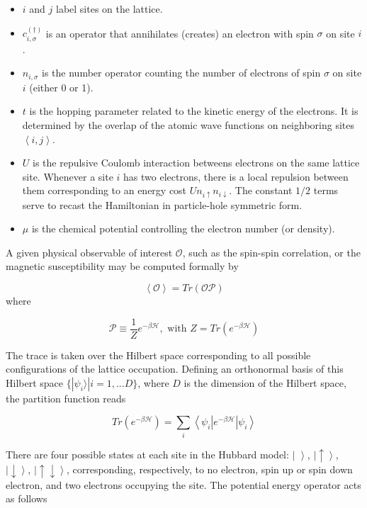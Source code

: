 \documentclass[10pt, twocolumn, twoside]{article}
\begin{document}
\begin{itemize}
\item $i$ and $j$ label sites on the lattice.
\item $c_{i,\sigma}^{(\dagger)}$ is an operator that annihilates (creates) an electron with spin $\sigma$ on site $i$.
\item $n_{i,\sigma}$ is the number operator counting the number of electrons of spin $\sigma$ on site $i$ (either 0 or 1).
\item $t$ is the hopping parameter related to the kinetic energy of the electrons. It is determined by the overlap of the atomic wave functions on neighboring sites $\left\langle i, j \right\rangle$.
\item $U$ is the repulsive Coulomb interaction betweens electrons on the same lattice site. Whenever a site $i$ has two electrons, there is a local repulsion between them corresponding to an energy cost $U n_{i \uparrow} n_{i \downarrow}$. The constant $1/2$ terms serve to recast the Hamiltonian in particle-hole symmetric form.
\item $\mu$ is the chemical potential controlling the electron number (or density).
\end{itemize}

A given physical observable of interest $\mathcal{O}$, such as the spin-spin correlation, or the magnetic susceptibility may be computed formally by

\begin{equation}
\left\langle \mathcal{O} \right\rangle = Tr ( \mathcal{O} \mathcal{P} )
\end{equation}
where

\begin{equation}\label{eq:projection}
\mathcal{P} \equiv \frac{1}{Z} e^{-\beta \mathcal{H} } , \text{ with } Z = Tr ( e^{-\beta \mathcal{H} } )
\end{equation}

The trace is taken over the Hilbert space corresponding to all possible configurations of the lattice occupation. Defining an orthonormal basis of this Hilbert space $\{ | \psi_i \rangle | i = 1, ... D \} $, where $D$ is the dimension of the Hilbert space, the partition function reads

\begin{equation}
Tr ( e^{-\beta \mathcal{H} } )= \sum_i \left\langle \psi_i | e^{-\beta \mathcal{H} } | \psi_i \right\rangle
\end{equation}

There are four possible states at each site in the Hubbard model: $\left| \,\, \right\rangle$, $\left|\uparrow \right\rangle$, $\left|\downarrow\right \rangle$, $\left|\uparrow \downarrow \right\rangle $, corresponding, respectively, to no electron, spin up or spin down electron, and two electrons occupying the site. The potential energy operator acts as follows
\end{document}
